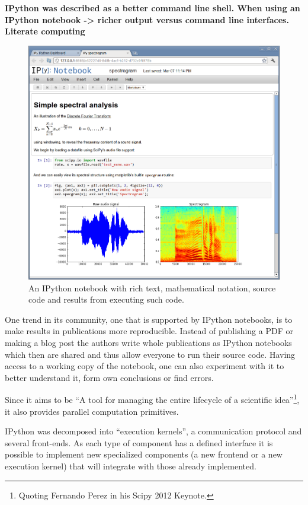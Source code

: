\documentclass{./llncs2e/llncs}
\begin{document}
	\textbf{
		IPython was described as a better command line shell.
		When using an IPython notebook -> richer output versus command line interfaces.
		Literate computing}
	
	\begin{figure}
		\centering
		\includegraphics[width=1.0\textwidth]{img/ipython_notebook}
		\caption{An IPython notebook with rich text, mathematical notation, source code and results from executing such code.}
		\label{fig:ipython:notebook}
	\end{figure}
	
	One trend in its community, one that is supported by IPython notebooks, is to make results in publications more reproducible. 
	Instead of publishing a PDF or making a blog post the authors write whole publications as IPython notebooks which then are shared and thus allow everyone to run their source code. 
	Having access to a working copy of the notebook, one can also experiment with it to better understand it, form own conclusions or find errors.
	
	Since it aims to be ``A tool for managing the entire lifecycle of a scientific idea''\footnote{Quoting Fernando Perez in his Scipy 2012 Keynote.}, it also provides parallel computation primitives.
	
	IPython was decomposed into ``execution kernels'', a communication protocol and several front-ends. 
	As each type of component has a defined interface it is possible to implement new specialized components (a new frontend or a new execution kernel) that will integrate with those already implemented.
	
\end{document}
